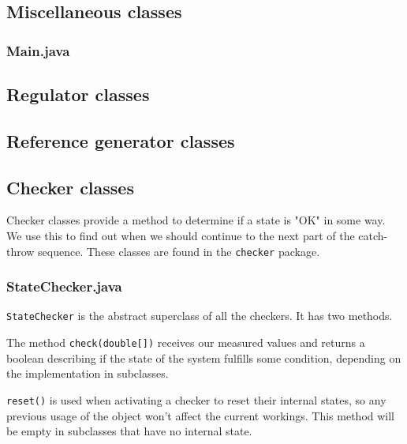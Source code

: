 
\subsection{Miscellaneous classes} 	%

\subsubsection{Main.java}

\subsection{Regulator classes}

\subsection{Reference generator classes}

\subsection{Checker classes}
Checker classes provide a method to determine if a state is "OK" in some way. We use this to find out when we should continue to the next part of the catch-throw sequence. These classes are found in the \texttt{checker} package.
\subsubsection{StateChecker.java}
\texttt{StateChecker} is the abstract superclass of all the checkers. It has two methods.

The method \texttt{check(double[])} receives our measured values and returns a boolean describing if the state of the system fulfills some condition, depending on the implementation in subclasses.

\texttt{reset()} is used when activating a checker to reset their internal states, so any previous usage of the object won't  affect the current workings. This method will be empty in subclasses that have no internal state.

